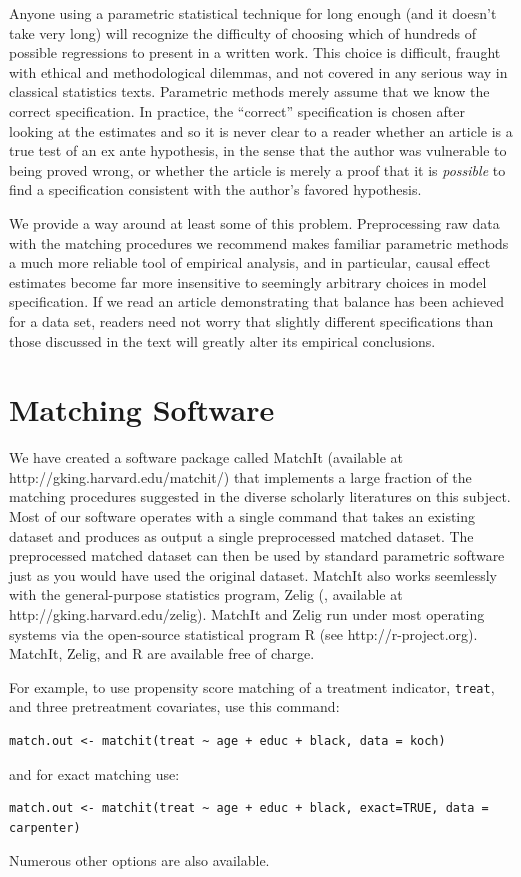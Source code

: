 \documentclass[11pt,titlepage]{article}
\begin{document}
Anyone using a parametric statistical technique for long enough (and
it doesn't take very long) will recognize the difficulty of choosing
which of hundreds of possible regressions to present in a written
work.  This choice is difficult, fraught with ethical and
methodological dilemmas, and not covered in any serious way in
classical statistics texts.  Parametric methods merely assume that we
know the correct specification.  In practice, the ``correct''
specification is chosen after looking at the estimates and so it is
never clear to a reader whether an article is a true test of an ex
ante hypothesis, in the sense that the author was vulnerable to being
proved wrong, or whether the article is merely a proof that it is
\emph{possible} to find a specification consistent with the author's
favored hypothesis.

We provide a way around at least some of this problem.  Preprocessing
raw data with the matching procedures we recommend makes familiar
parametric methods a much more reliable tool of empirical analysis,
and in particular, causal effect estimates become far more insensitive
to seemingly arbitrary choices in model specification.  If we read an
article demonstrating that balance has been achieved for a data set,
readers need not worry that slightly different specifications than
those discussed in the text will greatly alter its empirical
conclusions.

\appendix
\section{Matching Software}\label{s:matchit}

We have created a software package called MatchIt (available at
http://gking.harvard.edu/matchit/) that implements a large fraction of
the matching procedures suggested in the diverse scholarly literatures
on this subject.  Most of our software operates with a single command
that takes an existing dataset and produces as output a single
preprocessed matched dataset.  The preprocessed matched dataset can
then be used by standard parametric software just as you would have
used the original dataset.  MatchIt also works seemlessly with the
general-purpose statistics program, Zelig (\citet{ImaKinLau04},
available at http://gking.harvard.edu/zelig).  MatchIt and Zelig run
under most operating systems via the open-source statistical program R
(see http://r-project.org).  MatchIt, Zelig, and R are available free
of charge.

For example, to use propensity score matching of a treatment
indicator, \texttt{treat}, and three pretreatment covariates, use this
command:
\begin{verbatim}
match.out <- matchit(treat ~ age + educ + black, data = koch)
\end{verbatim}
and for exact matching use:
\begin{verbatim}
match.out <- matchit(treat ~ age + educ + black, exact=TRUE, data = carpenter)
\end{verbatim}
Numerous other options are also available.
\end{document}
